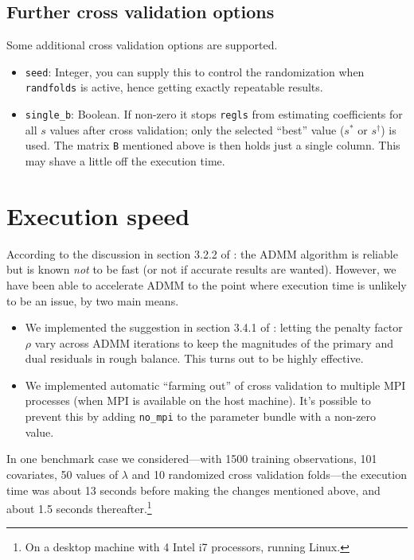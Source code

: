 \documentclass{article}
\begin{document}
\subsection*{Further cross validation options}

Some additional cross validation options are supported.

\begin{itemize}
\item \texttt{seed}: Integer, you can supply this to control the
  randomization when \texttt{randfolds} is active, hence getting
  exactly repeatable results.
\item \texttt{single\_b}: Boolean. If non-zero it stops \texttt{regls}
  from estimating coefficients for all $s$ values after cross
  validation; only the selected ``best'' value ($s^*$ or
  $s^{\dagger}$) is used. The matrix \texttt{B} mentioned above is
  then holds just a single column. This may shave a little off the
  execution time.

\end{itemize}

\section{Execution speed}
\label{sec:speed}

According to the discussion in section 3.2.2 of \cite{boyd2010}: the
ADMM algorithm is reliable but is known \textit{not} to be fast (or
not if accurate results are wanted). However, we have been able to
accelerate ADMM to the point where execution time is unlikely to be an
issue, by two main means.
\begin{itemize}
\item We implemented the suggestion in section 3.4.1 of
  \cite{boyd2010}: letting the penalty factor $\rho$ vary across ADMM
  iterations to keep the magnitudes of the primary and dual residuals
  in rough balance. This turns out to be highly effective.
\item We implemented automatic ``farming out'' of cross validation to
  multiple \textsf{MPI} processes (when \textsf{MPI} is available on
  the host machine). It's possible to prevent this by adding
  \texttt{no\_mpi} to the parameter bundle with a non-zero value.
\end{itemize}
In one benchmark case we considered---with 1500 training observations,
101 covariates, 50 values of $\lambda$ and 10 randomized cross
validation folds---the execution time was about 13 seconds before
making the changes mentioned above, and about 1.5 seconds
thereafter.\footnote{On a desktop machine with 4 Intel i7 processors,
  running Linux.}
\end{document}
